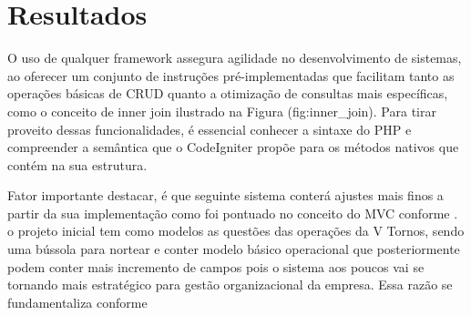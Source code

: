 \chapter{Resultados}

O uso de qualquer framework assegura agilidade no desenvolvimento de sistemas, ao oferecer um conjunto de instruções pré-implementadas que facilitam tanto as operações básicas de CRUD quanto a otimização de consultas mais específicas, como o conceito de inner join ilustrado na Figura (fig:inner_join). Para tirar proveito dessas funcionalidades, é essencial conhecer a sintaxe do PHP e compreender a semântica que o CodeIgniter propõe para os métodos nativos que contém na sua estrutura.

Fator importante destacar, é que seguinte sistema conterá ajustes mais finos a partir da sua implementação como foi pontuado no conceito do MVC conforme . o projeto inicial tem como modelos as questões das operações da V Tornos, sendo uma bússola para nortear e conter modelo básico operacional que posteriormente podem conter mais incremento de campos pois o sistema aos poucos vai se tornando mais estratégico para gestão organizacional da empresa. Essa razão se fundamentaliza conforme